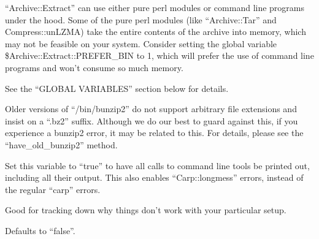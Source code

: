 \documentclass[]{article}
\begin{document}
``Archive::Extract'' can use either pure perl modules or command line
programs under the hood. Some of the pure perl modules (like
``Archive::Tar'' and Compress::unLZMA) take the entire contents of the
archive into memory, which may not be feasible on your system. Consider
setting the global variable \$Archive::Extract::PREFER\_BIN to 1, which
will prefer the use of command line programs and won't consume so much
memory.

See the ``GLOBAL VARIABLES'' section below for details.


Older versions of ``/bin/bunzip2'' do not support arbitrary file
extensions and insist on a ``.bz2'' suffix. Although we do our best to
guard against this, if you experience a bunzip2 error, it may be related
to this. For details, please see the ``have\_old\_bunzip2'' method.



Set this variable to ``true'' to have all calls to command line tools be
printed out, including all their output. This also enables
``Carp::longmess'' errors, instead of the regular ``carp'' errors.

Good for tracking down why things don't work with your particular setup.

Defaults to ``false''.

\end{document}
